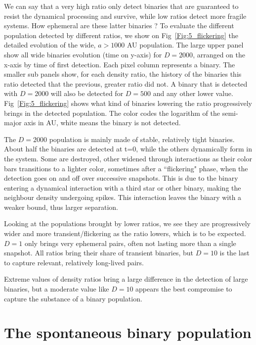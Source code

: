  We can say that a very high ratio only detect binaries that are guaranteed to resist the dynamical processing and survive, while low ratios detect more fragile systems. How ephemeral are these latter binaries ? To evaluate the different population detected by different ratios, we show on Fig~\ref{Fig:5_flickering} the detailed evolution of the wide, $a>1000$ AU population. The large upper panel show all wide binaries evolution (time on y-axis) for $D=2000$, arranged on the x-axis by time of first detection. Each pixel column represents a binary. The smaller sub panels show, for each density ratio, the history of the binaries this ratio detected that the previous, greater ratio did not. A binary that is detected with $D=2000$ will also be detected for $D=500$ and any other lower value. Fig~\ref{Fig:5_flickering} shows what kind of binaries lowering the ratio progressively brings in the detected population. The color codes the logarithm of the semi-major axis in AU, white means the binary is not detected.

The $D=2000$ population is mainly made of stable, relatively tight binaries. About half the binaries are detected at t=0, while the others dynamically form in the system. Some are destroyed, other widened through interactions as their color bars transitions to a lighter color, sometimes after a ``flickering" phase, when the detection goes on and off over successive snapshots. This is due to the binary entering a dynamical interaction with a third star or other binary, making the neighbour density undergoing spikes. This interaction leaves the binary with a weaker bound, thus larger separation. 

Looking at the populations brought by lower ratios, we see they are progressively wider and more transient/flickering as the ratio lowers, which is to be expected. $D=1$ only brings very ephemeral pairs, often not lasting more than a single snapshot. All ratios bring their share of transient binaries, but $D=10$ is the last to capture relevant, relatively long-lived pairs.

Extreme values of density ratios bring a large difference in the detection of large binaries, but a moderate value like $D=10$ appears the best compromise to capture the substance of a binary population.










\section{The spontaneous binary population} 
\label{Sec:5_spontaneous}



